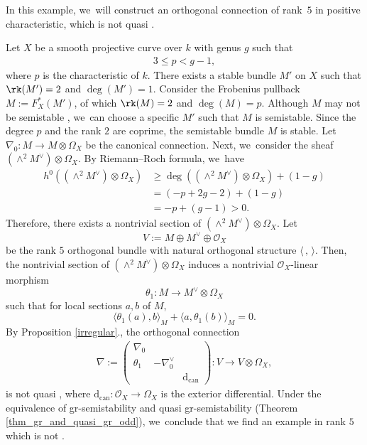 \begin{examp}\label{exmp_const}
In this example, we~will construct an orthogonal connection of rank~$5$ in positive characteristic, which is not quasi \grsemistable.

Let $X$ be a smooth projective curve over $k$ with genus $g$ such that
\begin{align*}
3\leq p < g-1,
\end{align*}
where $p$ is the characteristic of $k$. There exists a stable bundle $M'$ on $X$ such that $\rk(M') = 2$ and $\deg(M')=1$. Consider the Frobenius pullback $M:=F^*_X(M')$, of which $\rk(M)=2$ and $\deg(M)=p$. Although $M$ may not be semistable \cite{Gi73}, we~can choose a specific $M'$ such that $M$ is semistable. Since the degree $p$ and the rank $2$ are coprime, the semistable bundle $M$ is stable. Let $\nabla_0: M \to M \otimes \Omega_X$ be the canonical connection. Next, we~consider the sheaf $(\wedge^2 M^{\vee}) \otimes \Omega_X$. By Riemann--Roch formula, we~have
\begin{align*}
h^0((\wedge^2 M^\vee) \otimes \Omega_X) & \geq \deg( (\wedge^2 M^\vee) \otimes \Omega_X ) + (1-g) \\
& = (-p+2g-2) + (1-g) \\
& = -p + (g-1) > 0.
\end{align*}
Therefore, there exists a nontrivial section of $(\wedge^2 M^{\vee}) \otimes \Omega_X$. Let
\[
V:= M \oplus M^{\vee} \oplus \mathcal{O}_X
\]
be the rank $5$ orthogonal bundle with natural orthogonal structure $\langle \,, \, \rangle$. Then, the nontrivial section of $(\wedge^2 M^{\vee}) \otimes \Omega_X$ induces a nontrivial $\mathcal{O}_X$-linear morphism
\[
\theta_1: M \to M^{\vee} \otimes \Omega_X
\]
such that for local sections $a,b$ of $M$,
\[
\langle \theta_1(a),b \rangle_M + \langle a,\theta_1(b) \rangle_M = 0.
\]
By Proposition \ref{irregular}., the orthogonal connection
\begin{align*}
\nabla:=
\begin{pmatrix}
\nabla_0 & & \\
\theta_1 & -\nabla^\vee_0 & \\
& & \mathrm{d}_\mathrm{can}
\end{pmatrix}: V \to V \otimes \Omega_X,
\end{align*}
is not quasi \grsemistable, where $\mathrm{d}_\mathrm{can}: \mathcal{O}_X \to \Omega_X$ is the exterior differential. Under the equivalence of gr-semistability and quasi gr-semistability (Theorem \ref{thm_gr_and_quasi_gr_odd}), we~conclude that we find an example in rank $5$ which is not \grsemistable.
\end{examp}

